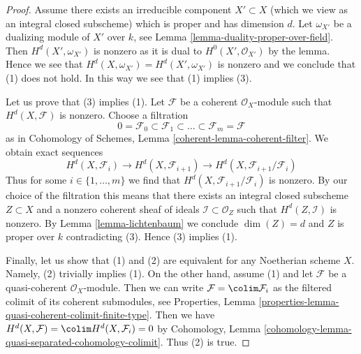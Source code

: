 \begin{proof}
Assume there exists an irreducible component $X' \subset X$ (which we view
as an integral closed subscheme) which is proper and has dimension $d$.
Let $\omega_{X'}$ be a dualizing module of $X'$ over $k$, see
Lemma \ref{lemma-duality-proper-over-field}. Then
$H^d(X', \omega_{X'})$ is nonzero as it is dual to $H^0(X', \mathcal{O}_{X'})$
by the lemma. Hence we see that $H^d(X, \omega_{X'}) = H^d(X', \omega_{X'})$
is nonzero and we conclude that (1) does not hold.
In this way we see that (1) implies (3).

\medskip\noindent
Let us prove that (3) implies (1).
Let $\mathcal{F}$ be a coherent $\mathcal{O}_X$-module such that
$H^d(X, \mathcal{F})$ is nonzero. Choose a filtration
$$
0 = \mathcal{F}_0 \subset \mathcal{F}_1 \subset
\ldots \subset \mathcal{F}_m = \mathcal{F}
$$
as in Cohomology of Schemes, Lemma \ref{coherent-lemma-coherent-filter}.
We obtain exact sequences
$$
H^d(X, \mathcal{F}_i) \to H^d(X, \mathcal{F}_{i + 1}) \to
H^d(X, \mathcal{F}_{i + 1}/\mathcal{F}_i)
$$
Thus for some $i \in \{1, \ldots, m\}$ we find that
$H^d(X, \mathcal{F}_{i + 1}/\mathcal{F}_i)$ is nonzero.
By our choice of the filtration this means that there exists
an integral closed subscheme $Z \subset X$
and a nonzero coherent sheaf of ideals $\mathcal{I} \subset \mathcal{O}_Z$
such that $H^d(Z, \mathcal{I})$ is nonzero.
By Lemma \ref{lemma-lichtenbaum}
we conclude $\dim(Z) = d$ and $Z$ is proper over $k$
contradicting (3). Hence (3) implies (1).

\medskip\noindent
Finally, let us show that (1) and (2) are equivalent for any Noetherian scheme
$X$. Namely, (2) trivially implies (1). On the other hand, assume (1) and
let $\mathcal{F}$ be a quasi-coherent $\mathcal{O}_X$-module. Then we can write
$\mathcal{F} = \colim \mathcal{F}_i$ as the filtered colimit of its coherent
submodules, see
Properties, Lemma \ref{properties-lemma-quasi-coherent-colimit-finite-type}.
Then we have $H^d(X, \mathcal{F}) = \colim H^d(X, \mathcal{F}_i) = 0$
by Cohomology, Lemma \ref{cohomology-lemma-quasi-separated-cohomology-colimit}.
Thus (2) is true.
\end{proof}












